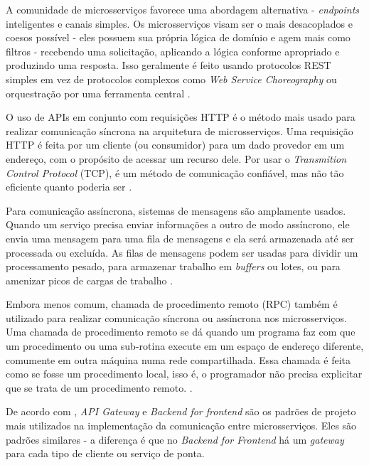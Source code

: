 A comunidade de microsserviços favorece uma abordagem alternativa - \emph{endpoints} inteligentes e canais simples. Os microsserviços visam ser o mais desacoplados e coesos possível - eles possuem sua própria lógica de domínio e agem mais como filtros - recebendo uma solicitação, aplicando a lógica conforme apropriado e produzindo uma resposta. Isso geralmente é feito usando protocolos REST simples em vez de protocolos complexos como \emph{Web Service Choreography} ou orquestração por uma ferramenta central \cite{martin-fowler-microservices}.

O uso de APIs em conjunto com requisições HTTP é o método mais usado para realizar comunicação síncrona na arquitetura de microsserviços. Uma requisição HTTP é feita por um cliente (ou consumidor) para um dado provedor em um endereço, com o propósito de acessar um recurso dele. Por usar o \emph{Transmition Control Protocol} (TCP), é um método de comunicação confiável, mas não tão eficiente quanto poderia ser \cite{martin-fowler-microservices}.

Para comunicação assíncrona, sistemas de mensagens são amplamente usados. Quando um serviço precisa enviar informações a outro de modo assíncrono, ele envia uma mensagem para uma fila de mensagens e ela será armazenada até ser processada ou excluída. As filas de mensagens podem ser usadas para dividir um processamento pesado, para armazenar trabalho em \emph{buffers} ou lotes, ou para amenizar picos de cargas de trabalho \cite{amazon-filas-de-mensagens}.

Embora menos comum, chamada de procedimento remoto (RPC) também é utilizado para realizar comunicação síncrona ou assíncrona nos microsserviços. Uma chamada de procedimento remoto se dá quando um programa faz com que um procedimento ou uma sub-rotina execute em um espaço de endereço diferente, comumente em outra máquina numa rede compartilhada. Essa chamada é feita como se fosse um procedimento local, isso é, o programador não precisa explicitar que se trata de um procedimento remoto. \cite{microsoft-grpc}.

De acordo com , \emph{API Gateway} e \emph{Backend for frontend} são os padrões de projeto mais utilizados na implementação da comunicação entre microsserviços. Eles são padrões similares - a diferença é que no \emph{Backend for Frontend} há um \emph{gateway} para cada tipo de cliente ou serviço de ponta.

